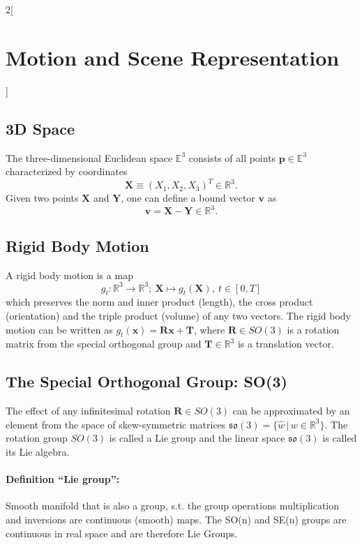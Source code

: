 \documentclass[oneside,fontsize=11pt,paper=a4]{scrartcl}
\begin{document}
\begin{multicols}{2}[\section{Motion and Scene Representation}]
\subsection{3D Space} \label{subsection:3d_space}
The three-dimensional Euclidean space $\mathbb{E}^3$ consists of all points $\mathbf{p} \in \mathbb{E}^3$ characterized by coordinates
\begin{equation*}
    \mathbf{X} \equiv (X_1, X_2, X_3)^T \in \mathbb{R}^3.
\end{equation*}
Given two points $\mathbf{X}$ and $\mathbf{Y}$, one can define a bound vector $\mathbf{v}$ as
\begin{equation*}
    \mathbf{v} = \mathbf{X} - \mathbf{Y} \in \mathbb{R}^3.
\end{equation*}

\subsection{Rigid Body Motion}
A rigid body motion is a map
\begin{equation*}
	g_t: \mathbb{R}^3 \rightarrow \mathbb{R}^3; \ \mathbf{X} \mapsto g_t(\mathbf{X}), \ t \in [0,T]
\end{equation*}
which preserves the norm and inner product (length), the cross product (orientation) and the triple product (volume) of any two vectors.
The rigid body motion can be written as $g_t(\mathbf{x}) = \mathbf{R}\mathbf{x} + \mathbf{T}$, where $\mathbf{R} \in SO(3)$ is a rotation matrix from the special orthogonal group and $\mathbf{T} \in \mathbb{R}^3$ is a translation vector.

\subsection{The Special Orthogonal Group: SO(3)}
The effect of any infinitesimal rotation $\mathbf{R} \in SO(3)$ can be approximated by an element from the space of skew-symmetric matrices $\mathfrak{so}(3) = \{\hat{w} \, \vert \, w \in \mathbb{R}^3\}$. The rotation group $SO(3)$ is called a Lie group and the linear space $\mathfrak{so}(3)$ is called its Lie algebra.

\paragraph{Definition ``Lie group'':} Smooth manifold that is also a group, s.t. the group operations multiplication and inversions are continuous (smooth) maps. The SO(n) and SE(n) groups are continuous in real space and are therefore Lie Groups.


\end{multicols}
\end{document}
